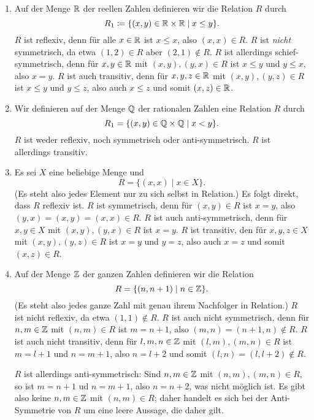\begin{bsp}
 \begin{enumerate}[leftmargin=*]
  
  \item
   Auf der Menge $\mathbb{R}$ der reellen Zahlen definieren wir die Relation $R$ durch
   \[
    R_1 \coloneqq \{(x,y) \in \mathbb{R} \times \mathbb{R} \mid x \leq y\}.
   \]
   $R$ ist reflexiv, denn für alle $x \in \mathbb{R}$ ist $x \leq x$, also $(x,x) \in R$. $R$ ist \emph{nicht} symmetrisch, da etwa $(1,2) \in R$ aber $(2,1) \notin R$. $R$ ist allerdings schief-symmetrisch, denn für $x,y \in \mathbb{R}$ mit $(x,y), (y,x) \in R$ ist $x \leq y$ und $y \leq x$, also $x = y$. $R$ ist auch transitiv, denn für $x,y,z \in \mathbb{R}$ mit $(x,y), (y,z) \in R$ ist $x \leq y$ und $y \leq z$, also auch $x \leq z$ und somit $(x,z) \in \mathbb{R}$.
  
  \item
   Wir definieren auf der Menge $\mathbb{Q}$ der rationalen Zahlen eine Relation $R$ durch
   \[
    R_1 = \{(x,y) \in \mathbb{Q} \times \mathbb{Q} \mid x < y\}.
   \]
   $R$ ist weder reflexiv, noch symmetrisch oder anti-symmetrisch. $R$ ist allerdings transitiv.
  
  \item
   Es sei $X$ eine beliebige Menge und
   \[
    R = \{(x,x) \mid x \in X\}.
   \]
   (Es steht also jedes Element nur zu sich selbst in Relation.) Es folgt direkt, dass $R$ reflexiv ist. $R$ ist symmetrisch, denn für $(x,y) \in R$ ist $x = y$, also $(y,x) = (x,y) = (x,x) \in R$. $R$ ist auch anti-symmetrisch, denn für $x,y \in X$ mit $(x,y), (y,x) \in R$ ist $x = y$. $R$ ist transitiv, den für $x,y,z \in X$ mit $(x,y), (y,z) \in R$ ist $x = y$ und $y = z$, also auch $x = z$ und somit $(x,z) \in R$.
  
  \item
   Auf der Menge $\mathbb{Z}$ der ganzen Zahlen definieren wir die Relation
   \[
    R = \{(n,n+1) \mid n \in \mathbb{Z}\}.
   \]
   (Es steht also jedes ganze Zahl mit genau ihrem Nachfolger in Relation.) $R$ ist nicht reflexiv, da etwa $(1,1) \notin R$. $R$ ist auch nicht symmetrisch, denn für $n,m \in \mathbb{Z}$ mit $(n,m) \in R$ ist $m = n+1$, also $(m,n) = (n+1,n) \notin R$. $R$ ist auch nicht transitiv, denn für $l,m,n \in \mathbb{Z}$ mit $(l,m),(m,n) \in R$ ist $m = l+1$ und $n = m+1$, also $n = l+2$ und somit $(l,n) = (l,l+2) \notin R$.
   
   $R$ ist allerdings anti-symmetrisch: Sind $n,m \in \mathbb{Z}$ mit $(n,m), (m,n) \in R$, so ist $m = n+1$ ud $n = m+1$, also $n = n+2$, was nicht möglich ist. Es gibt also keine $n,m \in \mathbb{Z}$ mit $(n,m) \in R$; daher handelt es sich bei der Anti-Symmetrie von $R$ um eine leere Aussage, die daher gilt.
  

\end{enumerate}
\end{bsp}
